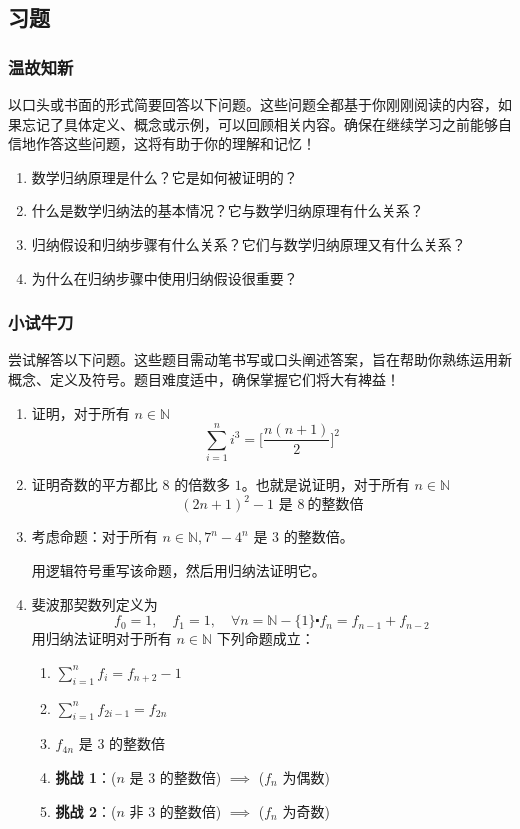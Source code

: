 \subsection{习题}

\subsubsection*{温故知新}

以口头或书面的形式简要回答以下问题。这些问题全都基于你刚刚阅读的内容，如果忘记了具体定义、概念或示例，可以回顾相关内容。确保在继续学习之前能够自信地作答这些问题，这将有助于你的理解和记忆！

\begin{enumerate}[label=(\arabic*)]
    \item 数学归纳原理是什么？它是如何被证明的？
    \item 什么是数学归纳法的基本情况？它与数学归纳原理有什么关系？
    \item 归纳假设和归纳步骤有什么关系？它们与数学归纳原理又有什么关系？
    \item 为什么在归纳步骤中使用归纳假设很重要？
\end{enumerate}

\subsubsection*{小试牛刀}

尝试解答以下问题。这些题目需动笔书写或口头阐述答案，旨在帮助你熟练运用新概念、定义及符号。题目难度适中，确保掌握它们将大有裨益！

\begin{enumerate}[label=(\arabic*)]
    \item 证明，对于所有 $n \in \mathbb{N}$
        \[\sum_{i=1}^{n} i^3 = \bigg[\frac{n(n+1)}{2}\bigg]^2\]
    \item 证明奇数的平方都比 $8$ 的倍数多 $1$。也就是说证明，对于所有 $n \in \mathbb{N}$
        \[(2n+1)^2-1 \text{\ 是\ } 8 {\ 的整数倍}\]
    \item 考虑命题：对于所有 $n \in \mathbb{N}, 7^n-4^n$ 是 $3$ 的整数倍。
    
    用逻辑符号重写该命题，然后用归纳法证明它。
    \item 斐波那契数列定义为
    \[f_0=1, \quad f_1=1, \quad \forall n=\mathbb{N}-\{1\} \centerdot f_n=f_{n-1}+f_{n-2}\]
    用归纳法证明对于所有 $n \in \mathbb{N}$ 下列命题成立：
    \begin{enumerate}[label=(\alph*)]
        \item $\displaystyle\sum_{i=1}^{n} f_i = f_{n+2}-1$
        \item $\displaystyle\sum_{i=1}^{n} f_{2i-1} = f_{2n}$
        \item $f_{4n}$ 是 $3$ 的整数倍
        \item \textbf{挑战 1}：($n$ 是 $3$ 的整数倍) $\implies$ ($f_n$ 为偶数)
        \item \textbf{挑战 2}：($n$ 非 $3$ 的整数倍) $\implies$ ($f_n$ 为奇数)
    \end{enumerate}
\end{enumerate}